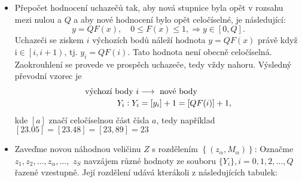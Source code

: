 \begin{mdframed}[style=mdexam]
\begin{example}
\begin{itemize}
              {\centering
                \resizebox{0.8\textwidth}{!}{%
                \begin{tabular}{c|c}
                          interval \(x\)     &  \(NF(x)\)         \\ \hline
                  \(\left[0,1\right)\)       &  \(N_0\)           \\ 
                  \(\left[1,2\right)\)       &  \(N_0 + N_1\)     \\ 
                  \(\cdots\)                 &  \(\cdots\)        \\
                  \(\left[j,j+1\right)\)     &  \(N_0 + N_1 + \cdots + N_j\) \\ 
                  \(\cdots\)                 &  \(\cdots\) \\
                  \(\left[Q-1,Q\right)\)     &  \(N_0 + N_1 + \cdots + N_{Q-1}\) \\ 
                  \(\left[Q,\infty\right)\)  &  \(N_0 + N_1 + \cdots + N_{Q} = N\) 
                \end{tabular}}
              \par}
        \item Přepočet hodnocení uchazečů tak, aby nová stupnice byla opět v rozsahu mezi nulou a
              \(Q\) a aby nové hodnocení bylo opět celočíselné, je následující:
              \begin{equation*}
                y =QF(x), \quad 0\leq F(x) \leq 1, \Rightarrow y \in[0,Q].
              \end{equation*}
              Uchazeči se ziskem \(i\) výchozích bodů náleží hodnota \(y = QF(x)\) právě když i\(
              \in \left[i, i + 1\right)\), tj. \(y_i = Q F(i)\). Tato hodnota není obecně
              celočíselná. Zaokrouhlení se provede ve prospěch uchazeče, tedy vždy nahoru. Výsledný
              převodní vzorec je
              \begin{equation*}
                \begin{multlined}
                  \text{výchozí body } i \longrightarrow\text{ nové body }  \\ 
                  \shoveleft[1cm]Y_i: Y_i = [y_i] + 1 = [QF(i)] + 1,
                \end{multlined}
              \end{equation*} 
              kde \([a]\) značí celočíselnou část čísla \(a\), tedy například \([\num{23.05}] =
              [\num{23.48}] = [23,89] = 23\)
        \item Zaveďme novou náhodnou veličinu \(Z\) s rozdělením \(\left\lbrace(z_\alpha,
              M_\alpha)\right\rbrace\): Označme \(z_1, z_2, \ldots, z_\alpha, ...,\) \(z_S\)
              navzájem různé hodnoty ze souboru \(\lbrace Y_i\rbrace, i = 0, 1, 2, \ldots, Q\)
              řazené vzestupně. Její rozdělení udává kterákoli z následujících tabulek:


\end{itemize}
\end{example}
\end{mdframed}
